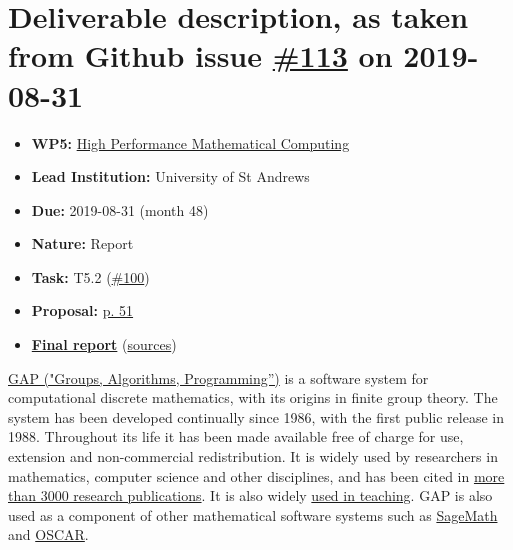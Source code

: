 \hypertarget{deliverable-description-as-taken-from-github-issue-113-on-2019-08-31}{%
\section*{\texorpdfstring{Deliverable description, as taken from Github
issue
\href{https://github.com/OpenDreamKit/OpenDreamKit/issues/113}{\#113} on
2019-08-31}{Deliverable description, as taken from Github issue \#113 on 2019-08-31}}\label{deliverable-description-as-taken-from-github-issue-113-on-2019-08-31}}

\begin{itemize}
\tightlist
\item
  \textbf{WP5:}
  \href{https://github.com/OpenDreamKit/OpenDreamKit/tree/master/WP5}{High
  Performance Mathematical Computing}
\item
  \textbf{Lead Institution:} University of St Andrews
\item
  \textbf{Due:} 2019-08-31 (month 48)
\item
  \textbf{Nature:} Report
\item
  \textbf{Task:} T5.2
  (\href{https://github.com/OpenDreamKit/OpenDreamKit/issues/100}{\#100})
\item
  \textbf{Proposal:}
  \href{https://github.com/OpenDreamKit/OpenDreamKit/raw/master/Proposal/proposal-www.pdf}{p.
  51}
\item
  \textbf{\href{https://github.com/OpenDreamKit/OpenDreamKit/raw/master/WP5/D5.15/report-final.pdf}{Final
  report}}
  (\href{https://github.com/OpenDreamKit/OpenDreamKit/raw/master/WP5/D5.15/}{sources})
\end{itemize}

\href{https://www.gap-system.org/}{GAP ("Groups, Algorithms,
Programming'')} is a software system for computational discrete
mathematics, with its origins in finite group theory. The system has
been developed continually since 1986, with the first public release in
1988. Throughout its life it has been made available free of charge for
use, extension and non-commercial redistribution. It is widely used by
researchers in mathematics, computer science and other disciplines, and
has been cited in
\href{https://www.gap-system.org/Doc/Bib/bib.html}{more than 3000
research publications}. It is also widely
\href{https://www.gap-system.org/Doc/Teaching/teaching.html}{used in
teaching}. GAP is also used as a component of other mathematical
software systems such as \href{http://www.sagemath.org/}{SageMath} and
\href{https://oscar.computeralgebra.de}{OSCAR}.

